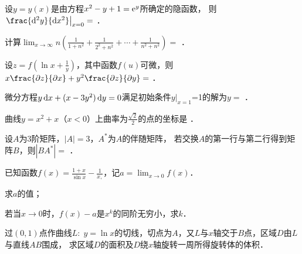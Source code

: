 \documentclass[plain,noanswer,medmath]{../../template/jnuexam}
\begin{document}
\begin{problem}
设$y = y(x)$是由方程$x^2 - y + 1 = \mathrm{e}^y$所确定的隐函数，
则$\left. \frac{\d^2y}{\dx^2} \right|_{x = 0} =$ \fillin{}．
\end{problem}


\begin{problem}
计算$\lim_{x \to \infty} n\left(\frac{1}{1 + n^2} + \frac{1}{2^2 + n^2}
+ \cdots + \frac{1}{n^2 + n^2} \right) =$ \fillin{}．
\end{problem}


\begin{problem}
设$z = f\left(\ln x + \frac{1}{y} \right)$，其中函数$f(u)$可微，则$x\frac{\pdz}{\pdx} + y^2\frac{\pdz}{\pdy} =$ \fillin{}．
\end{problem}


\begin{problem}
微分方程$y\mathop{}\!\mathrm{d} x + (x - 3y^2)\mathop{}\!\mathrm{d} y = 0$满足初始条件$y|_{x = 1}$=1的解为$y =$ \fillin{}．
\end{problem}


\begin{problem}
曲线$y = x^2 + x$（$x < 0$）上曲率为$\frac{\sqrt{2}}{2}$的点的坐标是 \fillin{}．
\end{problem}


\begin{problem}
设$A$为3阶矩阵，$|A| = 3$，$A^*$为$A$的伴随矩阵，
若交换$A$的第一行与第二行得到矩阵$B$，则$\left| BA^* \right| =$ \fillin{}．
\end{problem}




\begin{problem}[points=10]
已知函数$f(x) = \frac{1 + x}{\sin x} - \frac{1}{x,}$，记$a = \lim_{x \to 0} f(x)$．\par
\begin{enumerate*}
\item 求$a$的值；
\item 若当$x \to 0$时，$f(x) - a$是$x^k$的同阶无穷小，求$k$．
\end{enumerate*}
\end{problem}




\begin{problem}[points=10]
过$(0,1)$点作曲线$L:\;y = \ln x$的切线，切点为$A$，又$L$与$x$轴交于$B$点，区域$D$由$L$与直线$AB$围成，
求区域$D$的面积及$D$绕$x$轴旋转一周所得旋转体的体积．
\end{problem}
\end{document}

